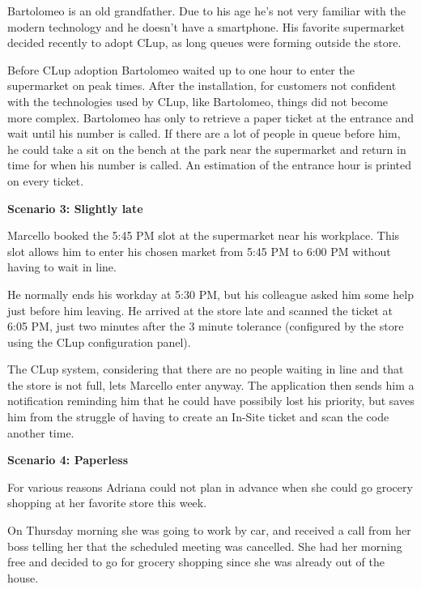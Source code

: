 Bartolomeo is an old grandfather. Due to his age he's not very familiar with the modern technology and he doesn't have a smartphone. His favorite supermarket decided recently to adopt CLup, as long queues were forming outside the store.

\smallskip

Before CLup adoption Bartolomeo waited up to one hour to enter the supermarket on peak times. After the installation, for customers not confident with the technologies used by CLup, like Bartolomeo, things did not become more complex. Bartolomeo has only to retrieve a paper ticket at the entrance and wait until his number is called. If there are a lot of people in queue before him, he could take a sit on the bench at the park near the supermarket and return in time for when his number is called. An estimation of the entrance hour is printed on every ticket.

\vfill
\pagebreak

\textbf{Scenario 3: Slightly late}

Marcello booked the 5:45 PM slot at the supermarket near his workplace. This slot allows him to enter his chosen market from 5:45 PM to 6:00 PM without having to wait in line.

\smallskip

He normally ends his workday at 5:30 PM, but his colleague asked him some help just before him leaving. He arrived at the store late and scanned the ticket at 6:05 PM, just two minutes after the 3 minute tolerance (configured by the store using the CLup configuration panel).

\smallskip

The CLup system, considering that there are no people waiting in line and that the store is not full, lets Marcello enter anyway.
The application then sends him a notification reminding him that he could have possibily lost his priority, but saves him from the struggle of having to create an In-Site ticket and scan the code another time.

\medskip

\textbf{Scenario 4: Paperless}

For various reasons Adriana could not plan in advance when she could go grocery shopping at her favorite store this week.

\smallskip
On Thursday morning she was going to work by car, and received a call from her boss telling her that the scheduled meeting was cancelled. She had her morning free and decided to go for grocery shopping since she was already out of the house.

